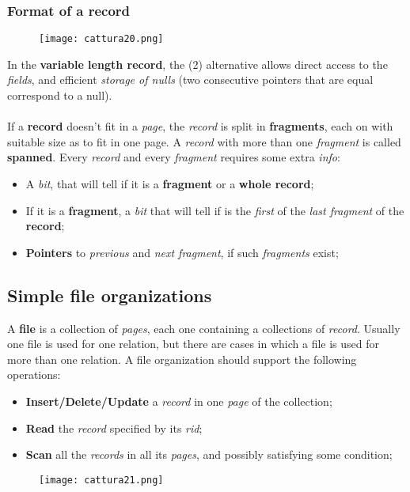 \documentclass{article}
\begin{document}
\subsubsection{Format of a record}
\begin{figure}[H]
  \centering
  \texttt{[image: cattura20.png]}
\end{figure}
In the \textbf{variable length record}, the (2) alternative allows direct access to the \emph{fields}, and efficient \emph{storage of nulls} (two consecutive pointers that are equal correspond to a null). \\\\If a \textbf{record} doesn't fit in a \emph{page}, the \emph{record} is split in \textbf{fragments}, each on with suitable size as to fit in one page. A \emph{record} with more than one \emph{fragment} is called \textbf{spanned}. Every \emph{record} and every \emph{fragment} requires some extra \emph{info}:
\begin{itemize}
\item A \emph{bit}, that will tell if it is a \textbf{fragment} or a \textbf{whole record};
\item If it is a \textbf{fragment}, a \emph{bit} that will tell if is the \emph{first} of the \emph{last fragment} of the \textbf{record};
\item \textbf{Pointers} to \emph{previous} and \emph{next fragment}, if such \emph{fragments} exist;
\end{itemize}
\subsection{Simple file organizations}
A \textbf{file} is a collection of \emph{pages}, each one containing a collections of \emph{record}. Usually one file is used for one relation, but there are cases in which a file is used for more than one relation. A file organization should support the following operations:
\begin{itemize}
\item \textbf{Insert/Delete/Update} a \emph{record} in one \emph{page} of the collection;
\item \textbf{Read} the \emph{record} specified by its \emph{rid};
\item \textbf{Scan} all the \emph{records} in all its \emph{pages}, and possibly satisfying some condition;
\end{itemize}
\begin{figure}[H]
  \centering
  \texttt{[image: cattura21.png]}
\end{figure}
\end{document}

